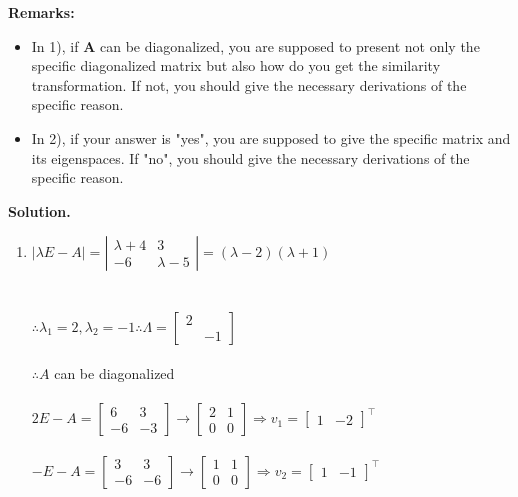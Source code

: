 \documentclass[english,onecolumn]{IEEEtran}
\begin{document}
{\bf Remarks:} 
\begin{itemize}
    \item In 1), if {\bf A} can be diagonalized, you are supposed to present not only the specific diagonalized matrix but also how do you get the similarity transformation.
    If not, you should give the necessary derivations of the specific reason.
    \item In 2), if your answer is "yes", you are supposed to give the specific matrix and its eigenspaces.
    If "no", you should give the necessary derivations of the specific reason.
\end{itemize}

\noindent
\textbf{Solution.}
\begin{enumerate}
    \item
    $|\lambda E-A|=\left|\begin{array}{cc}\lambda+4 & 3  \\ -6 & \lambda-5\end{array}\right|=(\lambda-2)(\lambda+1)$\\\\\\
    $\therefore \lambda_{1}=2, \lambda_{2}=-1
    \therefore \Lambda=\left[\begin{array}{cc}2& \\ &-1\end{array}\right]$\\\\
    $\therefore A$ can be diagonalized\\\\
    $2 E-A=\left[\begin{array}{cc}6 & 3 \\ -6 & -3\end{array}\right] \rightarrow\left[\begin{array}{cc}2 & 1 \\ 0 & 0\end{array}\right] \Rightarrow v_{1}=\left[\begin{array}{cc}1 & -2\end{array}\right]^{\top}$\\\\
    $-E-A= \left[\begin{array}{cc}3 & 3 \\ -6 & -6\end{array}\right] \rightarrow\left[\begin{array}{cc}1 & 1 \\ 0 & 0\end{array}\right] \Rightarrow v_{2}=\left[\begin{array}{cc}1 & -1\end{array}\right]^{\top}$\\\\

\end{enumerate}
\end{document}
